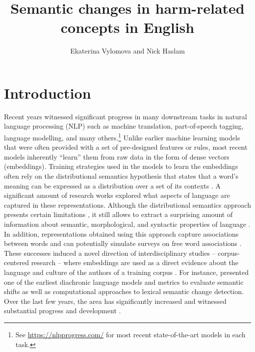 \documentclass[output=paper]{langsci/langscibook}
\author{Ekaterina Vylomova\orcid{0000-0002-4058-5459}\affiliation{The University of Melbourne}  and Nick Haslam\orcid{0000-0002-1913-2340}\affiliation{The University of Melbourne}}
\title{Semantic changes in harm-related concepts in English}
\begin{document}
\maketitle


\section{Introduction}\largerpage
Recent years witnessed significant progress in many downstream tasks in natural language processing (NLP) such as machine translation, part-of-speech tagging, language modelling, and many others.\footnote{See \url{https://nlpprogress.com/} for most recent state-of-the-art models in each task.}
Unlike earlier machine learning models that were often provided with a set of pre-designed features or rules, most recent models inherently ``learn'' them from raw data in the form of dense vectors (embeddings). Training strategies used in the models to learn the embeddings often rely on the distributional semantics hypothesis that states that a word's meaning can be expressed as a distribution over a set of its contexts \citep{firth1957synopsis,harris1954distributional,weaver1955translation}. A significant amount of research works explored what aspects of language are captured in these representations. Although the distributional semantics approach presents certain limitations \citep{bender2020climbing}, it still allows to extract a surprising amount of information about semantic, morphological, and syntactic properties of language \citep{mikolov2013linguistic,vylomova2016take,gladkova2016analogy,belinkov2019analysis,rogers2020primer}.
In addition, representations obtained using this approach capture associations between words and can potentially simulate surveys on free word associations \citep{agirre2009study,antoniak2018evaluating}.
These successes induced a novel direction of interdisciplinary studies -- corpus-centered research -- where embeddings are used as a direct evidence about the language and culture of the authors of a training corpus \citep{antoniak2018evaluating}.
For instance, \citet{hamilton-etal-2016-cultural,hamilton-etal-2016-diachronic} presented one of the earliest diachronic language models and metrics to evaluate semantic shifts as well as 
computational approaches to lexical semantic change detection. Over the last few years, the area has significantly increased and witnessed substantial progress and development \citep{schlechtweg-etal-2020-semeval}.
\end{document}
